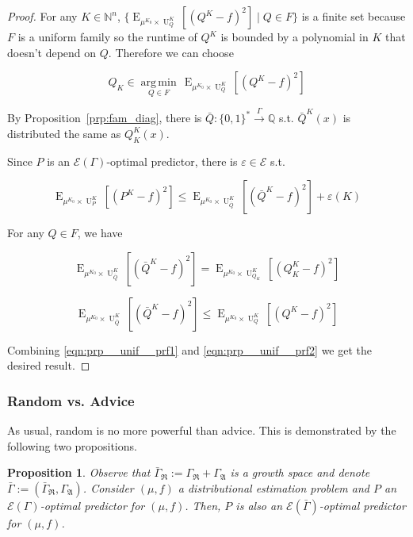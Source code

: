 \documentclass{article}
\numberwithin{equation}{section}
\theoremstyle{definition}
\theoremstyle{plain}
\newtheorem{proposition}{Proposition}[section]
\newcommand{\Bool}{\{0,1\}}
\newcommand{\Words}{{\Bool^*}}
\DeclareMathOperator{\E}{E}
\DeclareMathOperator{\Un}{U}
\newcommand{\Argmin}[1]{\underset{#1}{\operatorname{arg\,min}}\,}
\newcommand{\Nats}{\mathbb{N}}
\newcommand{\Rats}{\mathbb{Q}}
\newcommand{\GrowR}{\Gamma_{\mathfrak{R}}}
\newcommand{\GrowA}{\Gamma_{\mathfrak{A}}}
\newcommand{\Fall}{\mathcal{E}}
\newcommand{\EG}{\Fall(\Gamma)}
\newcommand{\Scheme}{\xrightarrow{\Gamma}}
\begin{document}
\begin{proof}

For any $K \in \Nats^n$, $\{\E_{\mu^{K_0} \times \Un_Q^{K}}[(Q^{K} - f)^2] \mid Q \in F\}$ is a finite set because $F$ is a uniform family so the runtime of $Q^{K}$ is bounded by a polynomial in $K$ that doesn't depend on $Q$. Therefore we can choose 

\[Q_{K} \in \Argmin{Q \in F} \E_{\mu^{K_0} \times \Un_Q^{K}}[(Q^{K} - f)^2]\]

By Proposition~\ref{prp:fam_diag}, there is $\bar{Q}: \Words \Scheme \Rats$ s.t. $\bar{Q}^{K}(x)$ is distributed the same as $Q_{K}^{K}(x)$.

Since $P$ is an $\EG$-optimal predictor, there is $\varepsilon \in \Fall$ s.t.

\begin{equation}
\label{eqn:prp__unif__prf1}
\E_{\mu^{K_0} \times \Un_P^{K}}[(P^{K} - f)^2] \leq \E_{\mu^{K_0} \times \Un_{\bar{Q}}^{K}}[(\bar{Q}^{K} - f)^2] + \varepsilon(K)
\end{equation}

For any $Q \in F$, we have 

$$\E_{\mu^{K_0} \times \Un_{\bar{Q}}^{K}}[(\bar{Q}^{K} - f)^2]=\E_{\mu^{K_0} \times \Un_{Q_{K}}^{K}}[(Q_{K}^{K} - f)^2]$$

\begin{equation}
\label{eqn:prp__unif__prf2}
\E_{\mu^{K_0} \times \Un_{\bar{Q}}^{K}}[(\bar{Q}^{K} - f)^2] \leq \E_{\mu^{K_0} \times \Un_Q^{K}}[(Q^{K} - f)^2]
\end{equation}

Combining \ref{eqn:prp__unif__prf1} and \ref{eqn:prp__unif__prf2} we get the desired result.
\end{proof}

\subsubsection{Random vs. Advice}

As usual, random is no more powerful than advice. This is demonstrated by the following two propositions.

\begin{proposition}

Observe that $\bar{\Gamma}_{\mathfrak{R}}:=\GrowR+\GrowA$ is a growth space and denote $\bar{\Gamma}:=(\bar{\Gamma}_{\mathfrak{R}},\GrowA)$. Consider $(\mu,f)$ a distributional estimation problem and $P$ an $\EG$-optimal predictor for $(\mu,f)$. Then, $P$ is also an $\Fall(\bar{\Gamma})$-optimal predictor for $(\mu,f)$.

\end{proposition}
\end{document}

